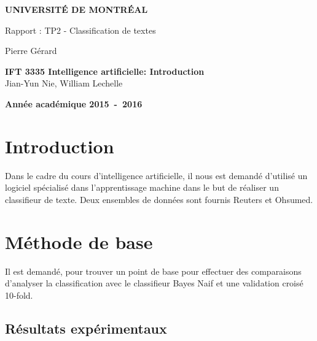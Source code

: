 \documentclass[a4paper,10pt]{article}
\begin{document}
\begin{titlepage}
\begin{center}
\textbf{\textsc{UNIVERSIT\'E DE MONTR\'EAL}}\\
\vfill{}\vfill{}
\begin{center}{\Huge Rapport : TP2 - Classification de textes}\end{center}{\Huge \par}
\begin{center}{\large Pierre Gérard}\end{center}{\Huge \par}
\vfill{}\vfill{} \vfill{}
\begin{center}{\large \textbf{IFT 3335 Intelligence artificielle: Introduction}}\hfill{\\Jian-Yun Nie, William Lechelle}\end{center}{\large\par}
\vfill{}\vfill{}\enlargethispage{3cm}
\textbf{Année académique 2015~-~2016}
\end{center}
\end{titlepage}





\section{Introduction}
Dans le cadre du cours d'intelligence artificielle, il nous est demandé d'utilisé un logiciel spécialisé dans l'apprentissage machine dans le but de réaliser un classifieur de texte. Deux ensembles de données sont fournis Reuters et Ohsumed.

\section{Méthode de base}

Il est demandé, pour trouver un point de base pour effectuer des comparaisons d'analyser la classification avec le classifieur Bayes Naif et une validation croisé 10-fold.

\subsection{Résultats expérimentaux}
\end{document}
